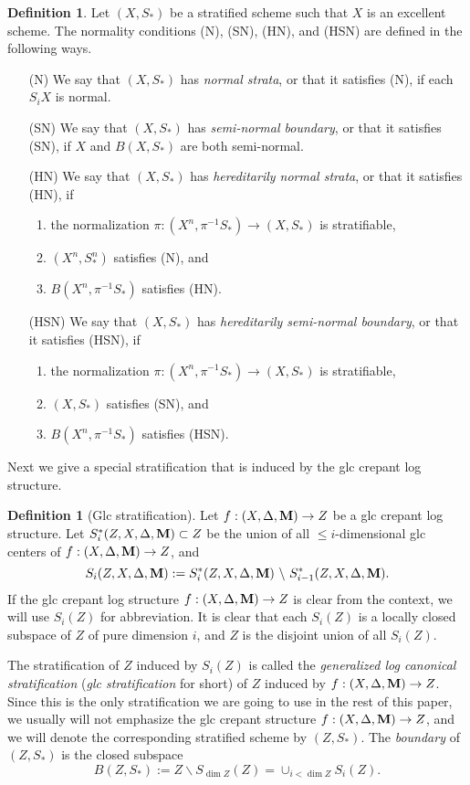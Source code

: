 \documentclass[11pt]{amsart}
\numberwithin{equation}{section}
\newcommand{\Mm}{{\bf{M}}}
\theoremstyle{definition}
\newtheorem{defn}[thm]{Definition}
\theoremstyle{definition}
\theoremstyle{definition}
\begin{document}
\begin{defn}
Let $(X,S_*)$ be a stratified scheme such that $X$ is an excellent scheme. The normality conditions (N), (SN), (HN), and (HSN)  are defined in the following ways.
\begin{enumerate}
    \item[(N)] We say that $(X,S_*)$ has {\it normal strata}, or that it satisfies (N), if each $S_iX$ is normal.
    \item[(SN)] We say that $(X,S_*)$ has {\it semi-normal boundary}, or that it satisfies (SN), if $X$ and $B(X,S_*)$ are both semi-normal.
    \item[(HN)] We say that $(X,S_*)$ has {\it hereditarily normal strata}, or that it satisfies (HN), if \begin{enumerate}
            \item the normalization $\pi: (X^n,\pi^{-1}S_*)\to (X,S_*)$ is stratifiable,
            \item $(X^n,S_*^n)$ satisfies (N), and
            \item $B(X^n,\pi^{-1}S_*)$ satisfies (HN).
    \end{enumerate}       
    \item[(HSN)] We say that $(X,S_*)$ has {\it hereditarily semi-normal boundary}, or that it
    satisfies (HSN), if \begin{enumerate}
            \item the normalization $\pi: (X^n,\pi^{-1}S_*)\to (X,S_*)$ is stratifiable,
            \item $(X,S_*)$ satisfies (SN), and
            \item $B(X^n,\pi^{-1}S_*)$ satisfies (HSN).
    \end{enumerate}
\end{enumerate}
\end{defn}


Next we give a special stratification that is induced by the glc crepant log structure. 

\begin{defn}[Glc stratification]
Let $f:(X,\Delta,\Mm)\to Z$ be a glc crepant log structure. Let $S^*_i(Z,X,\Delta,\Mm)\subset Z$ be the union of all $\le i$-dimensional glc centers of $f:(X,\Delta,\Mm)\to Z$, and
$$
S_i(Z,X,\Delta,\Mm):=S^*_i(Z,X,\Delta,\Mm)~\backslash ~S^*_{i-1}(Z,X,\Delta,\Mm).
$$
If the glc crepant log structure $f:(X,\Delta,\Mm)\to Z$ is clear from the context, we will use $S_i(Z)$ for abbreviation. It is clear that each $S_i(Z)$ is a locally closed subspace of $Z$ of pure dimension $i$, and $Z$ is the disjoint union of all $S_i(Z)$. 

The stratification of $Z$ induced by $S_i(Z)$ is called the \emph{generalized log canonical stratification} (\emph{glc stratification} for short) of $Z$ induced by $f:(X,\Delta,\Mm)\to Z$.  Since this is the only stratification we are going to use in the rest of this paper, we usually will not emphasize the glc crepant structure $f:(X,\Delta,\Mm)\to Z$, and we will denote the corresponding stratified scheme by $(Z,S_*)$. The \emph{boundary} of $(Z,S_*)$ is the closed subspace
$$B(Z,S_*):=Z\backslash S_{\dim Z}(Z)=\cup_{i<\dim Z}S_i(Z).$$
\end{defn}
\end{document}
